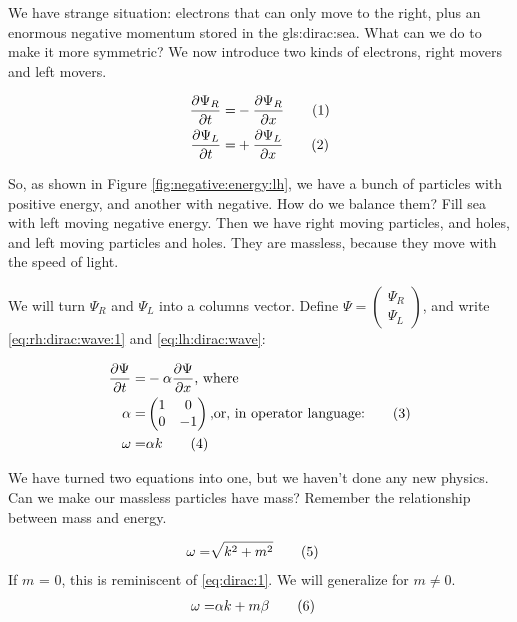 \documentclass[]{article}
\newcommand\numberthis{\addtocounter{equation}{1}\tag{\theequation}}
\begin{document}
We have strange situation: electrons that can only move to the right, plus an enormous negative momentum stored in the \gls{gls:dirac:sea}. What can we do to make it more symmetric? We now introduce two kinds of electrons, right movers and left movers.

\begin{align*}
	\frac{\partial \Psi_R}{\partial t} =& -\frac{\partial \Psi_R}{\partial x} \numberthis \label{eq:rh:dirac:wave:1}\\
	\frac{\partial \Psi_L}{\partial t} =& + \frac{\partial \Psi_L}{\partial x} \numberthis \label{eq:lh:dirac:wave}
\end{align*}

So, as shown in Figure \ref{fig:negative:energy:lh}, we have a bunch of particles with positive energy, and another with negative. How do we balance them? Fill sea with left moving negative energy. Then we have right moving particles, and holes, and left moving particles and holes. They are massless, because they move with the speed of light.

We will turn $\Psi_R$ and $\Psi_L$ into a columns vector. Define $\Psi=\begin{pmatrix}
	\Psi_R\\
	\Psi_L
\end{pmatrix}$, and write \eqref{eq:rh:dirac:wave:1} and \eqref{eq:lh:dirac:wave}:

\begin{align*}
	\frac{\partial \Psi}{\partial t} =& - \alpha \frac{\partial \Psi}{\partial x} \text{, where}\\
	\alpha =& \begin{pmatrix}
		1&0\\
		0&-1
	\end{pmatrix} \text{,or, in operator language:} \numberthis\label{eq:alpha}\\
	\omega =& \alpha k \numberthis \label{eq:dirac:1}
\end{align*}

We have turned two equations into one, but we haven't done any new physics. Can we make our massless particles have mass? Remember the relationship between mass and energy.

\begin{align*}
	\omega =& \sqrt{k^2 + m^2}  \numberthis \label{eq:omega:relativistic}
\end{align*}
If $m$ = 0, this is reminiscent of \eqref{eq:dirac:1}. We will generalize for $m\ne0$.
\begin{align*} 
	\omega =& \alpha k + m \beta  \numberthis \label{eq:Dirac:1D}
\end{align*}
\end{document}
